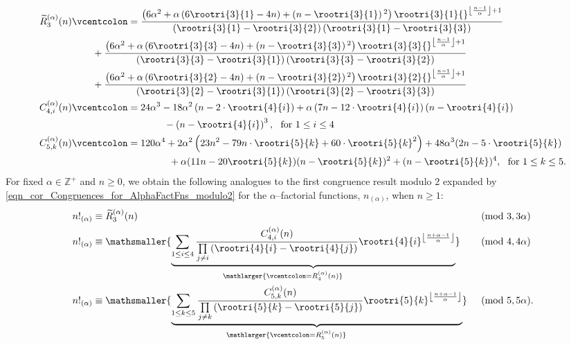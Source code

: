 \documentclass[12pt,reqno]{article}
\numberwithin{sfootnote}{section}
\numberwithin{equation}{section}
\theoremstyle{DefaultTheoremStyle}
\theoremstyle{definition}
\newcommand{\defequals}{\ensuremath{\vcentcolon=}}
\newcommand{\undersetbrace}[2]{\ensuremath{\underset{\mathlarger{#1}}{\mathsmaller{\underbrace{#2}}}}}
\begin{document}
\begin{align*} 
\widetilde{R}_3^{(\alpha)}(n) & \defequals 
     \frac{\left(6 \alpha ^2+\alpha 
     \left(6 \rootri{3}{1}-4 n\right)+\left(n-\rootri{3}{1}
     \right){}^2\right) 
     \rootri{3}{1}{}^{\left\lfloor \frac{n-1}{\alpha }\right\rfloor+1}}{ 
     \left(\rootri{3}{1}-\rootri{3}{2}\right) 
     \left(\rootri{3}{1}-\rootri{3}{3}\right)} \\ 
   & \phantom{\equiv\ } \quad + 
     \frac{\left(6 \alpha ^2+\alpha  \left(6 \rootri{3}{3}-4 n\right)+ 
     \left(n-\rootri{3}{3}\right){}^2\right)
      \rootri{3}{3}{}^{\left\lfloor \frac{n-1}{\alpha }\right\rfloor +1}}{ 
      \left(\rootri{3}{3}-\rootri{3}{1}\right) 
      \left(\rootri{3}{3}-\rootri{3}{2}\right)} \\ 
   & \phantom{\equiv\ } \quad + 
     \frac{\left(6 \alpha ^2+\alpha \left(6 \rootri{3}{2}-4 n\right) + 
     \left(n-\rootri{3}{2}\right){}^2\right) \rootri{3}{2}{}^{\left\lfloor 
     \frac{n-1}{\alpha }\right\rfloor +1}}{ 
     \left(\rootri{3}{2}-\rootri{3}{1}\right)
     \left(\rootri{3}{2}-\rootri{3}{3}\right)} \\ 
C_{4,i}^{(\alpha)}(n) & \defequals 
     24 \alpha^3-18 \alpha ^2 \left(n-2 \cdot \rootri{4}{i} 
     \right)+\alpha  \left(7 n-12 \cdot \rootri{4}{i}\right) 
     \left(n-\rootri{4}{i}\right) \\ 
   & \phantom{\defequals 24 \alpha^3\ } - 
     \left(n-\rootri{4}{i}\right)^3,\ 
     \text{ for } 
     1 \leq i \leq 4 \\ 
C_{5,k}^{(\alpha)}(n) & \defequals 
     120 \alpha^4 + 2 \alpha^2 \left(23 n^2-79 n \cdot \rootri{5}{k} + 
     60 \cdot \rootri{5}{k}^2\right) + 
     48 \alpha ^3 (2n - 5 \cdot \rootri{5}{k}) \\ 
     & \phantom{\defequals 120 \alpha^4\ } + 
     \alpha  (11 n-20 \rootri{5}{k}) (n-\rootri{5}{k})^2 + 
     (n-\rootri{5}{k})^4,\ 
     \text{ for } 
     1 \leq k \leq 5. 
\end{align*} 
For fixed $\alpha \in \mathbb{Z}^{+}$ and $n \geq 0$, 
we obtain the following analogues to the first congruence result modulo $2$ 
expanded by \eqref{eqn_cor_Congruences_for_AlphaFactFns_modulo2} 
for the $\alpha$--factorial functions, $n_{(\alpha)}$, 
when $n \geq 1$: 
\begin{align} 
\label{eqn_AlphaFactFnModulo3_congruence_stmts} 
n!_{(\alpha)} & \equiv \widetilde{R}_3^{(\alpha)}(n) && \pmod{3, 3\alpha} \\ 
\notag 
n!_{(\alpha)} & \equiv 
     \undersetbrace{ \defequals R_4^{(\alpha)}(n)}{
     \sum\limits_{1 \leq i \leq 4} 
     \frac{C_{4,i}^{(\alpha)}(n)}{\prod\limits_{j \neq i} 
     \left(\rootri{4}{i} - \rootri{4}{j}\right)} 
     \rootri{4}{i}^{\left\lfloor \frac{n+\alpha-1}{\alpha} \right\rfloor} 
     } 
     && \pmod{4, 4\alpha} \\ 
\notag 
n!_{(\alpha)} & \equiv 
     \undersetbrace{ \defequals R_5^{(\alpha)}(n)}{ 
     \sum\limits_{1 \leq k \leq 5} 
     \frac{C_{5,k}^{(\alpha)}(n)}{\prod\limits_{j \neq k} 
     \left(\rootri{5}{k} - \rootri{5}{j}\right)} 
     \rootri{5}{k}^{\left\lfloor \frac{n+\alpha-1}{\alpha} \right\rfloor} 
     } 
     && \pmod{5, 5\alpha}. 
\end{align} 
\end{document}
